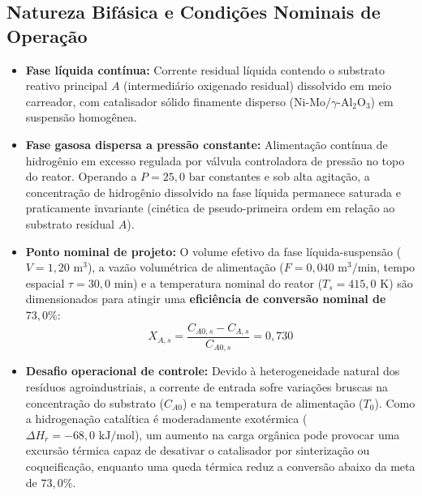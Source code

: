 \documentclass[11pt, a4paper]{article}
\begin{document}
\subsection{Natureza Bifásica e Condições Nominais de Operação}
\begin{itemize}
  \item \textbf{Fase líquida contínua:} Corrente residual líquida contendo o substrato reativo principal $A$ (intermediário oxigenado residual) dissolvido em meio carreador, com catalisador sólido finamente disperso ($\text{Ni-Mo}/\gamma\text{-Al}_2\text{O}_3$) em suspensão homogênea.
  \item \textbf{Fase gasosa dispersa a pressão constante:} Alimentação contínua de hidrogênio em excesso regulada por válvula controladora de pressão no topo do reator. Operando a $P = 25{,}0\text{ bar}$ constantes e sob alta agitação, a concentração de hidrogênio dissolvido na fase líquida permanece saturada e praticamente invariante (cinética de pseudo-primeira ordem em relação ao substrato residual $A$).
  \item \textbf{Ponto nominal de projeto:} O volume efetivo da fase líquida-suspensão ($V = 1{,}20\text{ m}^3$), a vazão volumétrica de alimentação ($F = 0{,}040\text{ m}^3/\text{min}$, tempo espacial $\tau = 30{,}0\text{ min}$) e a temperatura nominal do reator ($T_s = 415{,}0\text{ K}$) são dimensionados para atingir uma \textbf{eficiência de conversão nominal de $73{,}0\%$}:
  \begin{equation}
    X_{A,s} = \frac{C_{A0,s} - C_{A,s}}{C_{A0,s}} = 0{,}730
  \end{equation}
  \item \textbf{Desafio operacional de controle:} Devido à heterogeneidade natural dos resíduos agroindustriais, a corrente de entrada sofre variações bruscas na concentração do substrato ($C_{A0}$) e na temperatura de alimentação ($T_0$). Como a hidrogenação catalítica é moderadamente exotérmica ($\Delta H_r = -68{,}0\text{ kJ/mol}$), um aumento na carga orgânica pode provocar uma excursão térmica capaz de desativar o catalisador por sinterização ou coqueificação, enquanto uma queda térmica reduz a conversão abaixo da meta de $73{,}0\%$.
\end{itemize}
\end{document}
